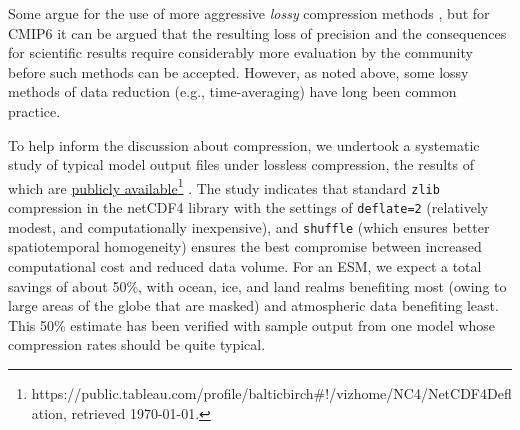 \documentclass[gmd,manuscript]{copernicus}
\begin{document}
Some argue for the use of more aggressive \emph{lossy} compression
methods \citep{ref:bakeretal2016}, but for CMIP6 it can be argued that
the resulting loss of precision and the consequences for scientific
results require considerably more evaluation by the community before
such methods can be accepted. However, as noted above, some lossy
methods of data reduction (e.g., time-averaging) have long been common
practice.

To help inform the discussion about compression, we undertook a
systematic study of typical model output files under lossless
compression, the results of which are
\href{https://public.tableau.com/profile/balticbirch\#!/vizhome/NC4/NetCDF4Deflation}{publicly
  available}\footnote{https://public.tableau.com/profile/balticbirch\#!/vizhome/NC4/NetCDF4Deflation,
  retrieved \today.} . The study indicates that standard \texttt{zlib}
compression in the netCDF4 library with the settings of
\texttt{deflate=2} (relatively modest, and computationally
inexpensive), and \texttt{shuffle} (which ensures better
spatiotemporal homogeneity) ensures the best compromise between
increased computational cost and reduced data volume. For an ESM, we
expect a total savings of about 50\%, with ocean, ice, and land realms
benefiting most (owing to large areas of the globe that are masked)
and atmospheric data benefiting least. This 50\% estimate has been
verified with sample output from one model whose compression rates
should be quite typical.
\end{document}
